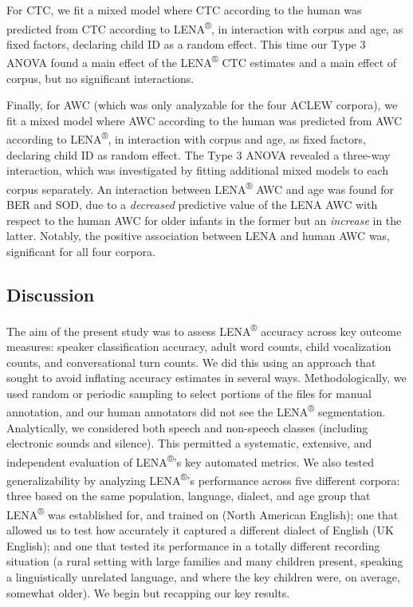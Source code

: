\documentclass[english,floatsintext,man]{apa6}
\begin{document}
For CTC, we fit a mixed model where CTC according to the human was
predicted from CTC according to LENA\textsuperscript{®}, in interaction
with corpus and age, as fixed factors, declaring child ID as a random
effect. This time our Type 3 ANOVA found a main effect of the
LENA\textsuperscript{®} CTC estimates and a main effect of corpus, but
no significant interactions.

Finally, for AWC (which was only analyzable for the four ACLEW corpora),
we fit a mixed model where AWC according to the human was predicted from
AWC according to LENA\textsuperscript{®}, in interaction with corpus and
age, as fixed factors, declaring child ID as random effect. The Type 3
ANOVA revealed a three-way interaction, which was investigated by
fitting additional mixed models to each corpus separately. An
interaction between LENA\textsuperscript{®} AWC and age was found for
BER and SOD, due to a \emph{decreased} predictive value of the LENA AWC
with respect to the human AWC for older infants in the former but an
\emph{increase} in the latter. Notably, the positive association between
LENA and human AWC was, significant for all four corpora.

\subsection{Discussion}\label{discussion}

The aim of the present study was to assess LENA\textsuperscript{®}
accuracy across key outcome measures: speaker classification accuracy,
adult word counts, child vocalization counts, and conversational turn
counts. We did this using an approach that sought to avoid inflating
accuracy estimates in several ways. Methodologically, we used random or
periodic sampling to select portions of the files for manual annotation,
and our human annotators did not see the LENA\textsuperscript{®}
segmentation. Analytically, we considered both speech and non-speech
classes (including electronic sounds and silence). This permitted a
systematic, extensive, and independent evaluation of
LENA\textsuperscript{®}'s key automated metrics. We also tested
generalizability by analyzing LENA\textsuperscript{®}'s performance
across five different corpora: three based on the same population,
language, dialect, and age group that LENA\textsuperscript{®} was
established for, and trained on (North American English); one that
allowed us to test how accurately it captured a different dialect of
English (UK English); and one that tested its performance in a totally
different recording situation (a rural setting with large families and
many children present, speaking a linguistically unrelated language, and
where the key children were, on average, somewhat older). We begin but
recapping our key results.
\end{document}
